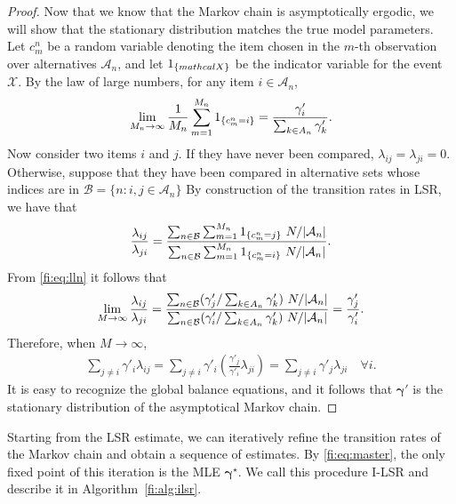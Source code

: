 \begin{proof}
Now that we know that the Markov chain is asymptotically ergodic, we will show that the stationary distribution matches the true model parameters.
Let $c^n_m$ be a random variable denoting the item chosen in the $m$-th observation over alternatives $\mathcal{A}_n$, and let
$1_{\left \{ mathcal{X} \right \} }$ be the indicator variable for the event $\mathcal{X}$.
By the law of large numbers, for any item $i \in \mathcal{A}_n$,
\begin{align}
\label{fi:eq:lln}
\lim_{M_n \to \infty} \frac{1}{M_n} \sum_{m = 1}^{M_n} 1_{\left \{ c^n_m = i \right \} } = \frac{\gamma'_i}{\sum_{k \in A_n} \gamma'_k}.
\end{align}
Now consider two items $i$ and $j$.
If they have never been compared, $\lambda_{ij} = \lambda_{ji} = 0$.
Otherwise, suppose that they have been compared in alternative sets whose indices are in $\mathcal{B} = \{ n : i, j \in \mathcal{A}_n \}$
By construction of the transition rates in LSR, we have that
\begin{align*}
\frac{\lambda_{ij}}{\lambda_{ji}}
= \frac{\sum_{n \in \mathcal{B}} \sum_{m = 1}^{M_n} \Indic{c^n_m = j} \ N / \Abs{\mathcal{A}_n}}
       {\sum_{n \in \mathcal{B}} \sum_{m = 1}^{M_n} \Indic{c^n_m = i} \ N / \Abs{\mathcal{A}_n}}.
\end{align*}
From \eqref{fi:eq:lln} it follows that
\begin{align*}
\lim_{M \to \infty}\frac{\lambda_{ij}}{\lambda_{ji}}
    = \frac{\sum_{n \in \mathcal{B}} (\gamma'_j / \sum_{k \in A_n} \gamma'_k) \ N / \lvert\mathcal{A}_n\rvert}
         {\sum_{n \in \mathcal{B}} (\gamma'_i / \sum_{k \in A_n} \gamma'_k) \ N / \lvert\mathcal{A}_n\rvert}
    = \frac{\gamma'_j }{\gamma'_i}.
\end{align*}
Therefore, when $M \to \infty$,
\begin{align*}
\sum_{j \ne i} \gamma'_i \lambda_{ij} = \sum_{j \ne i} \gamma'_i \left( \frac{\gamma'_j}{\gamma'_i} \lambda_{ji} \right)
                                    = \sum_{j \ne i} \gamma'_j \lambda_{ji}  \quad \forall i.
\end{align*}
It is easy to recognize the global balance equations, and it follows that $\bm{\gamma}'$ is the stationary distribution of the asymptotical Markov chain.
\end{proof}

Starting from the LSR estimate, we can iteratively refine the transition rates of the Markov chain and obtain a sequence of estimates.
By \eqref{fi:eq:master}, the only fixed point of this iteration is the MLE $\bm{\gamma}^\star$.
We call this procedure I-LSR and describe it in Algorithm~\ref{fi:alg:ilsr}.

